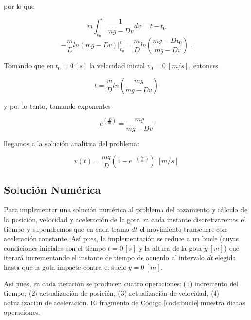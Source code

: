 \documentclass[journal]{IEEEtran}
\begin{document}
por lo que

\begin{equation}
  m \int_{v_0}^v \displaystyle\frac{1}{mg - Dv}dv = t - t_0
\end{equation}
\begin{equation}
  - \displaystyle\frac{m}{D} ln(mg - Dv)|^v_{v_0} = \displaystyle\frac{m}{D}ln\left(\displaystyle\frac{mg - Dv_0}{mg - Dv}\right)~.
\end{equation}

Tomando que en $t_0 = 0~[s]$ la velocidad inicial $v_0 = 0~[m/s]$, entonces

\begin{equation}
  t = \displaystyle\frac{m}{D} ln \left(\displaystyle\frac{mg}{mg - Dv}\right)
\end{equation}

y por lo tanto, tomando exponentes

\begin{equation}
  e^(\displaystyle\frac{tD}{m}) = \displaystyle\frac{mg}{mg - Dv}
\end{equation}

llegamos a la solución analítica del problema:

\begin{equation}
  v(t) = \displaystyle\frac{mg}{D}(1 - e^{-(\displaystyle\frac{tD}{m})})~[m/s]
\end{equation}



\subsection{Solución Numérica}

Para implementar una solución numérica al problema del rozamiento y cálculo de la posición, velocidad y aceleración de la gota en cada instante discretizaremos el tiempo y supondremos que en cada tramo $dt$ el movimiento transcurre con aceleración constante. Así pues, la implementación se reduce a un bucle (cuyas condiciones iniciales son el tiempo $t = 0~[s]$ y la altura de la gota $y~[m]$) que iterará incrementando el instante de tiempo de acuerdo al intervalo $dt$ elegido hasta que la
gota impacte contra el suelo $y = 0~[m]$.

Así pues, en cada iteración se producen cuatro operaciones: (1) incremento del tiempo, (2) actualización de posición, (3) actualización de velocidad, (4) actualización de aceleración. El fragmento de Código \ref{code:bucle} muestra dichas operaciones.
\end{document}
